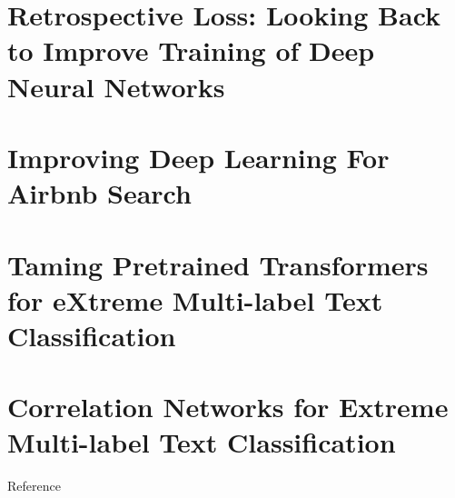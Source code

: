 \begin{bibunit}[plainnat]

\chapter{Retrospective Loss: Looking Back to Improve Training of Deep Neural Networks}
\cite{jandial2020retrospective}

\chapter{Improving Deep Learning For Airbnb Search}
\cite{haldar2020improving}

\chapter{Taming Pretrained Transformers for eXtreme Multi-label Text Classification}

\chapter{Correlation Networks for Extreme Multi-label Text Classification}
Reference~\cite{xun2020correlation}

\putbib[refs_dl]
\end{bibunit}
